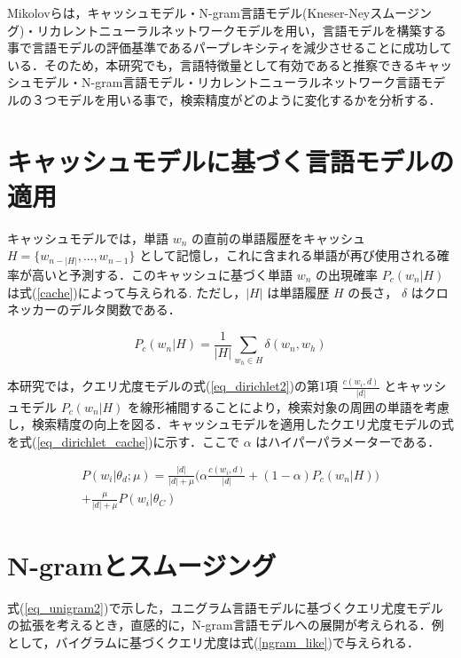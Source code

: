 Mikolovら\cite{mikolov}は，キャッシュモデル・N-gram言語モデル(Kneser-Neyスムージング)・リカレントニューラルネットワークモデルを用い，言語モデルを構築する事で言語モデルの評価基準であるパープレキシティを減少させることに成功している．そのため，本研究でも，言語特徴量として有効であると推察できるキャッシュモデル・N-gram言語モデル・リカレントニューラルネットワーク言語モデルの３つモデルを用いる事で，検索精度がどのように変化するかを分析する．

\section{キャッシュモデルに基づく言語モデルの適用}
キャッシュモデルでは，単語 $w_n$ の直前の単語履歴をキャッシュ $H = \{ w_{n-|H|}, ..., w_{n-1}\} $ として記憶し，これに含まれる単語が再び使用される確率が高いと予測する．このキャッシュに基づく単語 $w_n$ の出現確率 $P_c(w_n|H)$ は式(\ref{cache})によって与えられる. ただし，$|H|$ は単語履歴 $H$ の長さ， $\delta$ はクロネッカーのデルタ関数である．

\begin{equation}
		P_c(w_n|H) = \frac{1}{|H|} \sum_{w_h \in H} \delta (w_n, w_h)
    \label{cache}
\end{equation}

本研究では，クエリ尤度モデルの式(\ref{eq_dirichlet2})の第1項 $\frac{c(w_i, d)}{|d|}$ とキャッシュモデル $P_c(w_n|H)$ を線形補間することにより，検索対象の周囲の単語を考慮し，検索精度の向上を図る．キャッシュモデルを適用したクエリ尤度モデルの式を式(\ref{eq_dirichlet_cache})に示す．ここで $\alpha$ はハイパーパラメーターである．

\begin{equation}
\begin{split}
    P(w_i|\theta_d;\mu) = \frac{|d|}{|d|+\mu} \Biggl( \alpha \frac{c(w_i, d)}{|d|} + (1 - \alpha) P_c(w_n|H) \Biggr)\\
    + \frac{\mu}{|d|+\mu} P(w_i|\theta_C)  
    \label{eq_dirichlet_cache}
\end{split}
\end{equation}

\section{N-gramとスムージング}

式(\ref{eq_unigram2})で示した，ユニグラム言語モデルに基づくクエリ尤度モデルの拡張を考えるとき，直感的に，N-gram言語モデルへの展開が考えられる．例として，バイグラムに基づくクエリ尤度は式(\ref{ngram_like})で与えられる．\cite{bigram}

